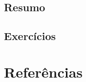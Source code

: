 \documentclass[
  letterpaper,
  DIV=11,
  numbers=noendperiod]{scrreprt}
\newlength{\cslhangindent}
\newlength{\cslentryspacingunit} %
\newenvironment{CSLReferences}[2] %
 {%
  \setlength{\parindent}{0pt}
  \ifodd #1
  \let\oldpar\par
  \def\par{\hangindent=\cslhangindent\oldpar}
  \fi
  \setlength{\parskip}{#2\cslentryspacingunit}
 }%
 {}
\begin{document}
\hypertarget{resumo}{%
\section{Resumo}\label{resumo}}

\hypertarget{exercuxedcios}{%
\section{Exercícios}\label{exercuxedcios}}

\hypertarget{referuxeancias-1}{%
\chapter*{Referências}\label{referuxeancias-1}}

\hypertarget{refs}{}
\begin{CSLReferences}{0}{0}
\end{CSLReferences}
\end{document}
